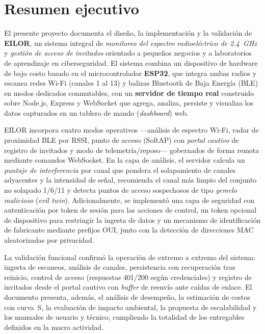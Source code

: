 \chapter*{Resumen ejecutivo}

El presente proyecto documenta el diseño, la implementación y la validación de \textbf{EILOR}, un sistema integral de \emph{monitoreo del espectro radioeléctrico de 2.4~GHz} y \emph{gestión de acceso de invitados} orientado a pequeños negocios y a laboratorios de aprendizaje en ciberseguridad. El sistema combina un dispositivo de hardware de bajo costo basado en el microcontrolador \textbf{ESP32}, que integra ambas radios y escanea redes Wi\nobreakdash-Fi (canales 1 al 13) y balizas Bluetooth de Baja Energía (BLE) en modos dedicados conmutables, con un \textbf{servidor de tiempo real} construido sobre Node.js, Express y WebSocket que agrega, analiza, persiste y visualiza los datos capturados en un tablero de mando (\emph{dashboard}) web.

EILOR incorpora cuatro modos operativos ---análisis de espectro Wi\nobreakdash-Fi, radar de proximidad BLE por RSSI, punto de acceso (SoftAP) con \emph{portal cautivo} de registro de invitados y modo de telemetría/reposo--- gobernados de forma remota mediante comandos WebSocket. En la capa de análisis, el servidor calcula un \emph{puntaje de interferencia} por canal que pondera el solapamiento de canales adyacentes y la intensidad de señal, recomienda el canal más limpio del conjunto no solapado 1/6/11 y detecta puntos de acceso sospechosos de tipo \emph{gemelo malicioso} (\emph{evil twin}). Adicionalmente, se implementó una capa de seguridad con autenticación por token de sesión para las acciones de control, un token opcional de dispositivo para restringir la ingesta de datos y un mecanismo de identificación de fabricante mediante prefijos OUI, junto con la detección de direcciones MAC aleatorizadas por privacidad.

La validación funcional confirmó la operación de extremo a extremo del sistema: ingesta de escaneos, análisis de canales, persistencia con recuperación tras reinicio, control de acceso (respuestas 401/200 según credenciales) y registro de invitados desde el portal cautivo con \emph{buffer} de reenvío ante caídas de enlace. El documento presenta, además, el análisis de desempeño, la estimación de costos con curva~S, la evaluación de impacto ambiental, la propuesta de escalabilidad y los manuales de usuario y técnico, cumpliendo la totalidad de los entregables definidos en la macro actividad.

